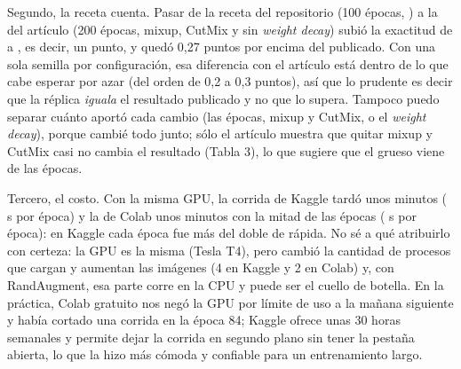 Segundo, la receta cuenta. Pasar de la receta del repositorio (100 épocas, \pct{\accColab}) a la del artículo (200
épocas, mixup, CutMix y sin \emph{weight decay}) subió la exactitud de \pct{\accColab} a \pct{\accKaggle}, es decir, un
punto, y quedó 0,27 puntos por encima del  publicado. Con una sola semilla por configuración, esa
diferencia con el artículo está dentro de lo que cabe esperar por azar (del orden de 0,2 a 0,3 puntos), así que lo
prudente es decir que la réplica \emph{iguala} el resultado publicado y no que lo supera. Tampoco puedo separar
cuánto aportó cada cambio (las épocas, mixup y CutMix, o el \emph{weight decay}), porque cambié todo junto; sólo el
artículo muestra que quitar mixup y CutMix casi no cambia el resultado (Tabla 3), lo que sugiere que el grueso viene de
las épocas.

Tercero, el costo. Con la misma GPU, la corrida de Kaggle tardó unos \minKaggle{} minutos (\segKaggle{} s por época)
y la de Colab unos \minColab{} minutos con la mitad de las épocas (\segColab{} s por época): en Kaggle cada época
fue más del doble de rápida. No sé a qué atribuirlo con certeza: la GPU es la misma (Tesla T4), pero cambió la
cantidad de procesos que cargan y aumentan las imágenes (4 en Kaggle y 2 en Colab) y, con RandAugment, esa parte corre
en la CPU y puede ser el cuello de botella. En la práctica, Colab gratuito nos negó la GPU por límite de uso a la
mañana siguiente y había cortado una corrida en la época 84; Kaggle ofrece unas 30 horas semanales y permite dejar la
corrida en segundo plano sin tener la pestaña abierta, lo que la hizo más cómoda y confiable para un entrenamiento
largo.
